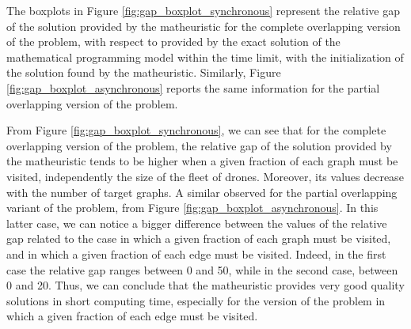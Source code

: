 \noindent
The boxplots in Figure \ref{fig:gap_boxplot_synchronous}  represent the relative gap of the solution provided by the matheuristic for the complete overlapping version of the problem, with respect to  provided by the exact solution of the mathematical programming model within the time limit, with the initialization of the solution found by the matheuristic. Similarly, Figure \ref{fig:gap_boxplot_asynchronous} reports the same information for the partial overlapping version of the problem.



\noindent
From Figure \ref{fig:gap_boxplot_synchronous}, we can see that for the complete overlapping version of the problem, the relative gap of the solution provided by the matheuristic tends to be higher when a given fraction of each graph must be visited, independently  the size of the fleet of drones. Moreover, its values decrease with the number of target graphs. A similar  observed for the partial overlapping variant of the problem, from Figure \ref{fig:gap_boxplot_asynchronous}. In this latter case, we can notice a bigger difference between the values of the relative gap related to the case in which a given fraction of each graph must be visited, and  in which a given fraction of each edge must be visited. Indeed, in the first case the relative gap ranges between 0 and 50, while in the second case, between 0 and 20. Thus, we can conclude that the matheuristic provides very good quality solutions in short computing time, especially for the version of the problem in which a given fraction of each edge must be visited.
